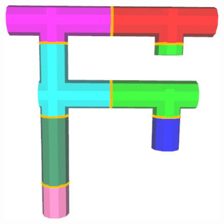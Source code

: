 \begin{figure} [htbp]
{    \begin{minipage}[b]{0.18\textwidth}
      \centering
      \includegraphics[scale=0.13]{figs/f6.joinFP-F-init.eps}
    \end{minipage}}
\end{figure}
